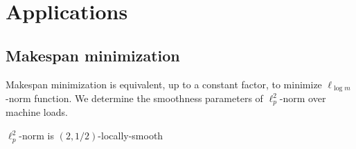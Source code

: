 
\section{Applications} \label{appix-applications}

\subsection{Makespan minimization}


Makespan minimization is equivalent, up to a constant factor, to minimize $\ell_{\log m}$-norm function.
We determine the smoothness parameters of $\ell_{p}^{2}$-norm over machine loads.

\begin{lemma}
$\ell_{p}^{2}$-norm is $(2,1/2)$-locally-smooth
\end{lemma}
%
